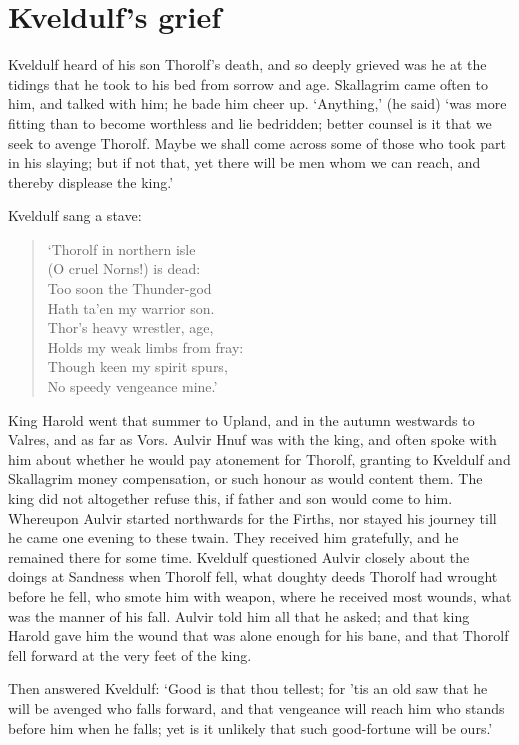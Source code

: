 \chapter{Kveldulf's grief}
Kveldulf heard of his son Thorolf's death, and so deeply grieved was he at the tidings that he took to his bed from sorrow and age. Skallagrim came often to him, and talked with him; he bade him cheer up. `Anything,' (he said) `was more fitting than to become worthless and lie bedridden; better counsel is it that we seek to avenge Thorolf. Maybe we shall come across some of those who took part in his slaying; but if not that, yet there will be men whom we can reach, and thereby displease the king.'

Kveldulf sang a stave:

\begin{verse}
`Thorolf in northern isle \\
(O cruel Norns!) is dead: \\
Too soon the Thunder-god \\
Hath ta'en my warrior son. \\
Thor's heavy wrestler, age, \\
Holds my weak limbs from fray: \\
Though keen my spirit spurs, \\
No speedy vengeance mine.' \\
\end{verse}
King Harold went that summer to Upland, and in the autumn westwards to Valres, and as far as Vors. Aulvir Hnuf was with the king, and often spoke with him about whether he would pay atonement for Thorolf, granting to Kveldulf and Skallagrim money compensation, or such honour as would content them. The king did not altogether refuse this, if father and son would come to him. Whereupon Aulvir started northwards for the Firths, nor stayed his journey till he came one evening to these twain. They received him gratefully, and he remained there for some time. Kveldulf questioned Aulvir closely about the doings at Sandness when Thorolf fell, what doughty deeds Thorolf had wrought before he fell, who smote him with weapon, where he received most wounds, what was the manner of his fall. Aulvir told him all that he asked; and that king Harold gave him the wound that was alone enough for his bane, and that Thorolf fell forward at the very feet of the king.

Then answered Kveldulf: `Good is that thou tellest; for 'tis an old saw that he will be avenged who falls forward, and that vengeance will reach him who stands before him when he falls; yet is it unlikely that such good-fortune will be ours.'

